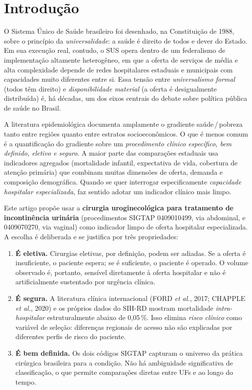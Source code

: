 \documentclass[12pt,a4paper,oneside]{article}
\begin{document}
\section{Introdução}\label{sec:intro}

O Sistema Único de Saúde brasileiro foi desenhado, na Constituição
de 1988, sobre o princípio da \textit{universalidade}: a saúde é
direito de todos e dever do Estado. Em sua execução real, contudo,
o SUS opera dentro de um federalismo de implementação altamente
heterogêneo, em que a oferta de serviços de média e alta
complexidade depende de redes hospitalares estaduais e municipais
com capacidades muito diferentes entre si. Essa tensão entre
\textit{universalismo formal} (todos têm direito) e
\textit{disponibilidade material} (a oferta é desigualmente
distribuída) é, há décadas, um dos eixos centrais do debate sobre
política pública de saúde no Brasil.

A literatura epidemiológica documenta amplamente o gradiente
saúde\,/\,pobreza tanto entre regiões quanto entre estratos
socioeconômicos. O que é menos comum é a quantificação do
gradiente sobre um \textit{procedimento clínico específico, bem
definido, eletivo e seguro}. A maior parte das comparações
estaduais usa indicadores agregados (mortalidade infantil,
expectativa de vida, cobertura de atenção primária) que
combinam muitas dimensões de oferta, demanda e composição
demográfica. Quando se quer interrogar especificamente
\textit{capacidade hospitalar especializada}, faz sentido adotar
um indicador clínico mais limpo.

Este artigo propõe usar a \textbf{cirurgia uroginecológica para
tratamento de incontinência urinária} (procedimentos SIGTAP
0409010499, via abdominal, e 0409070270, via vaginal) como
indicador limpo de oferta hospitalar especializada. A escolha é
deliberada e se justifica por três propriedades:

\begin{enumerate}
\item \textbf{É eletiva.} Cirurgias eletivas, por definição,
podem ser adiadas. Se a oferta é insuficiente, o paciente espera;
se é suficiente, o paciente é operado. O volume observado é,
portanto, sensível diretamente à oferta hospitalar e não é
artificialmente sustentado por urgência clínica.

\item \textbf{É segura.} A literatura clínica internacional
(FORD \textit{et al.}, 2017; CHAPPLE \textit{et al.}, 2020)
e os próprios dados do SIH-RD mostram mortalidade
\textit{intra-hospitalar} estruturalmente abaixo de 0{,}05\,\%.
Isso elimina \textit{risco clínico} como variável de seleção:
diferenças regionais de acesso não são explicadas por diferentes
perfis de risco do paciente.

\item \textbf{É bem definida.} Os dois códigos SIGTAP capturam o
universo da prática cirúrgica brasileira para a condição. Não há
ambiguidade significativa de classificação, o que permite
comparações diretas entre UFs e ao longo do tempo.
\end{enumerate}
\end{document}
